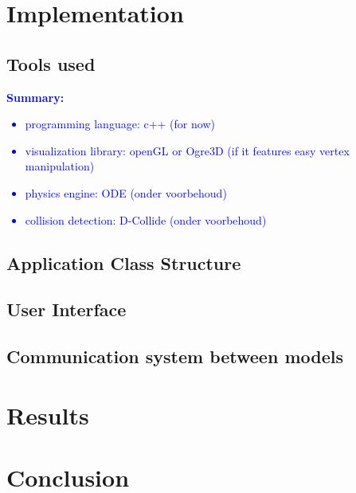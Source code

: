 \documentclass{article}
\newcommand{\inhoud}[1]{\textcolor{blue}{\textbf{\newline Summary: }\it{#1}}}
\begin{document}
\section{Implementation}
\subsection{Tools used}
\inhoud{ 
\begin{itemize}
\item programming language: c++ (for now)
\item visualization library: openGL or Ogre3D (if it features easy vertex manipulation) 
\item physics engine: ODE (onder voorbehoud)  
\item collision detection: D-Collide (onder voorbehoud)
\end{itemize}
}

\subsection{Application Class Structure}

\subsection{User Interface}
\subsection{Communication system between models}

\section{Results}

\section{Conclusion}

\newpage 
\end{document}
